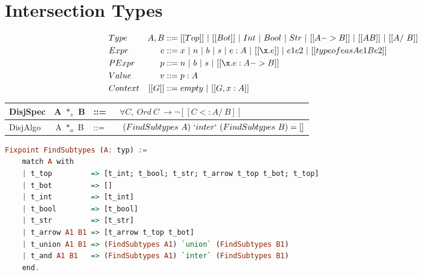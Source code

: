 \section{Intersection Types}
\label{sec:intersection}


\begin{align*}
&Type &A, B&::= [[Top]] ~ | ~[[Bot]]~|~ Int ~| ~ Bool ~ |~ Str ~| ~ [[A->B]]~ |~ [[A \/ B]] ~ |~ [[A /\ B]]\\
&Expr &e &::= x ~|~ n ~| ~ b ~ | ~ s ~| ~ e:A ~|~[[\x.e]] ~ | ~ e1e2 ~|~ [[typeof e as A e1 B e2]]\\
&PExpr & p &::= n ~| ~ b ~ | ~ s ~|~ [[\x.e : A->B]] \\
&Value &v &::= p : A \\
&Context & [[G]] &::= empty~ |~ [[G , x : A]]
\end{align*}

     {\renewcommand{\arraystretch}{1.5}
     \begin{center}
     \begin{tabular}{|lcll|}
       \hline
      DisjSpec & A $*_s$ B & ::= & ~$\forall C, ~ Ord ~ C ~ \rightarrow \neg [[C <: A /\ B]]$\\
       \hline
      DisjAlgo & A $*_a$ B & ::= & ~ $(FindSubtypes ~ A) ~ `inter` ~ (FindSubtypes ~ B) = []$ \\
       \hline
     \end{tabular}
     \end{center} }

\begin{lstlisting}[language=Haskell]
Fixpoint FindSubtypes (A: typ) :=
    match A with
    | t_top         => [t_int; t_bool; t_str; t_arrow t_top t_bot; t_top]
    | t_bot         => []
    | t_int         => [t_int]
    | t_bool        => [t_bool]
    | t_str         => [t_str]
    | t_arrow A1 B1 => [t_arrow t_top t_bot]
    | t_union A1 B1 => (FindSubtypes A1) `union` (FindSubtypes B1)
    | t_and A1 B1   => (FindSubtypes A1) `inter` (FindSubtypes B1)
    end.
\end{lstlisting}